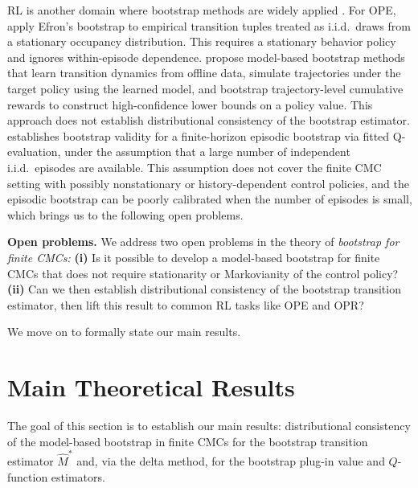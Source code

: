 \documentclass{article}
\numberwithin{equation}{section}
\begin{document}
RL is another domain where bootstrap methods are widely applied \citep{krishnamurthy2016partially,faradonbeh2019applications,ramprasad2023online,banerjee2023probably,banerjee2025off,banerjeesmall_2025}. For OPE, \citet{kostrikov2020statistical} apply Efron's bootstrap to empirical transition tuples treated as i.i.d.\ draws from a stationary occupancy distribution. This requires a stationary behavior policy and ignores within-episode dependence.
\citet{hanna2017bootstrapping} propose model-based bootstrap methods that learn transition dynamics from offline data, simulate trajectories under the target policy using the learned model, and bootstrap trajectory-level cumulative rewards to construct high-confidence lower bounds on a policy value. This approach does not establish distributional consistency of the bootstrap estimator. 
\citet{hao2021bootstrapping} establishes bootstrap validity for a finite-horizon episodic bootstrap via fitted Q-evaluation, under the assumption that a large number of independent i.i.d.\ episodes are available.
This assumption does not cover the finite CMC setting with possibly nonstationary or history-dependent control policies, and the episodic bootstrap can be poorly calibrated when the number of episodes is small, which brings us to the following open problems.

\textbf{Open problems.} We address two open problems in the theory of \textit{bootstrap for finite CMCs:} \textbf{(i)} Is it possible to develop a model-based bootstrap for finite CMCs that does not require stationarity or Markovianity of the control policy? \textbf{(ii)} Can we then establish distributional consistency of the bootstrap transition estimator, then lift this result to common RL tasks like OPE and OPR? 

We move on to formally state our main results.
\section{Main Theoretical Results}
\label{sec:theory}

The goal of this section is to establish our main results: distributional consistency of the model-based bootstrap in finite CMCs for the bootstrap transition estimator $\hat M^\ast$ and, via the delta method, for the bootstrap plug-in value and $Q$-function estimators. 
\end{document}
